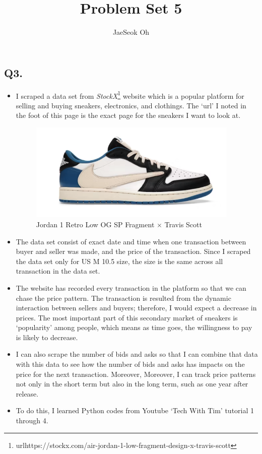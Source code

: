 \documentclass{article}
\title{Problem Set 5}
\author{JaeSeok Oh}
\begin{document}
	\maketitle
	
	\begin{large}
		\section*{Q3.}
		
		\begin{itemize}
			\item I scraped a data set from \textit{StockX}\footnote{url{https://stockx.com/air-jordan-1-low-fragment-design-x-travis-scott}} website which is a popular platform for selling and buying sneakers, electronics, and clothings. The `url' I noted in the foot of this page is the exact page for the sneakers I want to look at.
			\begin{figure}[h]
				\caption{Jordan 1 Retro Low OG SP Fragment $ \times $ Travis Scott}
				\centering
				\includegraphics[width = 100mm]{TS.png}
			\end{figure}
			\item The data set consist of exact date and time when one transaction between buyer and seller was made, and the price of the transaction. Since I scraped the data set only for US M 10.5 size, the size is the same across all transaction in the data set.
			\item The website has recorded every transaction in the platform so that we can chase the price pattern. The transaction is resulted from the dynamic interaction between sellers and buyers; therefore, I would expect a decrease in prices. The most important part of this secondary market of sneakers is `popularity' among people, which means as time goes, the willingness to pay is likely to decrease.
			\item I can also scrape the number of bids and asks so that I can combine that data with this data to see how the number of bids and asks has impacts on the price for the next transaction. Moreover, Moreover, I can track price patterns not only in the short term but also in the long term, such as one year after release.
			\item To do this, I learned Python codes from  \faYoutube Youtube `Tech With Tim' tutorial 1 through 4.
		\end{itemize}
		

\end{large}
\end{document}
